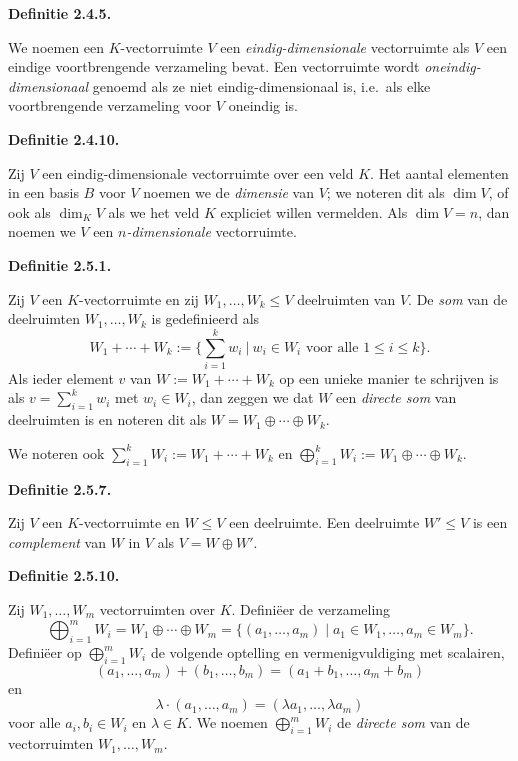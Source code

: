\documentclass[10pt,a4paper]{article}
\newenvironment{res}[1]{%
  \par\noindent\textbf{Definitie #1.}~\ignorespaces
}{%
  \par\vspace{2pt}\normalfont
}
\begin{document}
\begin{res}{2.4.5}
We noemen een $K$-vectorruimte $V$ een \textit{eindig-dimensionale} vectorruimte als $V$ een eindige voortbrengende verzameling bevat. Een vectorruimte wordt \textit{oneindig-dimensionaal} genoemd als ze niet eindig-dimensionaal is, i.e.\ als elke voortbrengende verzameling voor $V$ oneindig is.
\end{res}

\begin{res}{2.4.10}
Zij $V$ een eindig-dimensionale vectorruimte over een veld $K$. Het aantal elementen in een basis $B$ voor $V$ noemen we de \textit{dimensie} van $V$; we noteren dit als $\dim V$, of ook als $\dim_K V$ als we het veld $K$ expliciet willen vermelden. Als $\dim V=n$, dan noemen we $V$ een \textit{$n$-dimensionale} vectorruimte.
\end{res}

\begin{res}{2.5.1}
Zij $V$ een $K$-vectorruimte en zij $W_1,\dots,W_k\le V$ deelruimten van $V$. De \textit{som} van de deelruimten $W_1,\dots,W_k$ is gedefinieerd als
\[
W_1+\cdots+W_k:=\Big\{\sum_{i=1}^k w_i \ \Big|\ w_i\in W_i \text{ voor alle } 1\le i\le k\Big\}.
\]
Als ieder element $v$ van $W:=W_1+\cdots+W_k$ op een unieke manier te schrijven is als $v=\sum_{i=1}^k w_i$ met $w_i\in W_i$, dan zeggen we dat $W$ een \textit{directe som} van deelruimten is en noteren dit als $W=W_1\oplus\cdots\oplus W_k$.

We noteren ook $\sum_{i=1}^k W_i:=W_1+\cdots+W_k$ en $\bigoplus_{i=1}^k W_i:=W_1\oplus\cdots\oplus W_k$.
\end{res}

\begin{res}{2.5.7}
Zij $V$ een $K$-vectorruimte en $W\le V$ een deelruimte. Een deelruimte $W'\le V$ is een \textit{complement} van $W$ in $V$ als $V=W\oplus W'$.
\end{res}

\begin{res}{2.5.10}
Zij $W_1,\dots,W_m$ vectorruimten over $K$. Defini\"eer de verzameling
\[
\bigoplus_{i=1}^m W_i = W_1\oplus\cdots\oplus W_m = \{(a_1,\dots,a_m) \mid a_1\in W_1,\dots,a_m\in W_m\}.
\]
Defini\"eer op $\bigoplus_{i=1}^m W_i$ de volgende optelling en vermenigvuldiging met scalairen,
\[
(a_1,\dots,a_m)+(b_1,\dots,b_m)=(a_1+b_1,\dots,a_m+b_m)
\]
en
\[
\lambda\cdot(a_1,\dots,a_m)=(\lambda a_1,\dots,\lambda a_m)
\]
voor alle $a_i,b_i\in W_i$ en $\lambda\in K$. We noemen $\bigoplus_{i=1}^m W_i$ de \textit{directe som} van de vectorruimten $W_1,\dots,W_m$.
\end{res}
\end{document}
